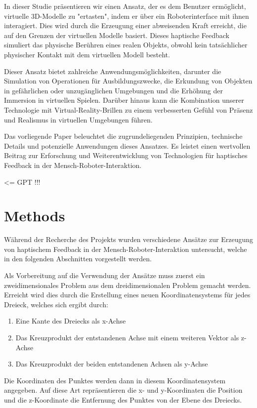 \documentclass[conference]{IEEEtran}
\begin{document}
In dieser Studie präsentieren wir einen Ansatz, der es dem Benutzer ermöglicht, virtuelle 3D-Modelle zu "ertasten", indem er über ein Roboterinterface mit ihnen interagiert. Dies wird durch die Erzeugung einer abweisenden Kraft erreicht, die auf den Grenzen der virtuellen Modelle basiert. Dieses haptische Feedback simuliert das physische Berühren eines realen Objekts, obwohl kein tatsächlicher physischer Kontakt mit dem virtuellen Modell besteht. 

Dieser Ansatz bietet zahlreiche Anwendungsmöglichkeiten, darunter die Simulation von Operationen für Ausbildungszwecke, die Erkundung von Objekten in gefährlichen oder unzugänglichen Umgebungen und die Erhöhung der Immersion in virtuellen Spielen. Darüber hinaus kann die Kombination unserer Technologie mit Virtual-Reality-Brillen zu einem verbesserten Gefühl von Präsenz und Realismus in virtuellen Umgebungen führen.

Das vorliegende Paper beleuchtet die zugrundeliegenden Prinzipien, technische Details und potenzielle Anwendungen dieses Ansatzes. Es leistet einen wertvollen Beitrag zur Erforschung und Weiterentwicklung von Technologien für haptisches Feedback in der Mensch-Roboter-Interaktion.

<= GPT !!!

\section{Methods}

Während der Recherche des Projekts wurden verschiedene Ansätze zur Erzeugung von haptischem Feedback in der Mensch-Roboter-Interaktion untersucht, welche in den folgenden Abschnitten vorgestellt werden.

Als Vorbereitung  auf die Verwendung der Ansätze muss zuerst ein zweidimensionales Problem aus dem dreidimensionalen Problem gemacht werden. Erreicht wird dies durch die Erstellung eines neuen Koordinatensystems für jedes Dreieck, welches sich ergibt durch:
\begin{enumerate}
    \item Eine Kante des Dreiecks als x-Achse
    \item Das Kreuzprodukt der entstandenen Achse mit einem weiteren Vektor als z-Achse
    \item Das Kreuzprodukt der beiden entstandenen Achsen als y-Achse
\end{enumerate}
Die Koordinaten des Punktes werden dann in diesem Koordinatensystem angegeben. Auf diese Art repräsentieren die x- und y-Koordinaten die Position und die z-Koordinate die Entfernung des Punktes von der Ebene des Dreiecks. 
\end{document}
